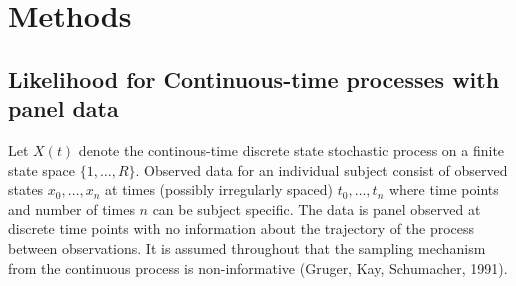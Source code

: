 \documentclass{uwstat572}
\begin{document}
%
%
%
\section{Methods}
\subsection{Likelihood for Continuous-time processes with panel data}
Let $X(t)$ denote the continous-time discrete state stochastic process on a finite state space $\{1,\ldots,R\}$. Observed data for an individual subject consist of observed states $x_0 ,\ldots, x_n$ at times (possibly irregularly spaced) $t_0,\ldots,t_n$ where time points and number of times $n$ can be subject specific. The data is panel observed at discrete time points with no information about the trajectory of the process between observations. It is assumed throughout that the sampling mechanism from the continuous process is non-informative (Gruger, Kay, Schumacher, 1991).
\end{document}
